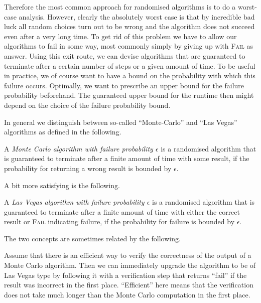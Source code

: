 Therefore the most common approach for randomised algorithms is to do a 
worst-case analysis. However, clearly the absolutely worst case is
that by incredible bad luck all random choices turn out to be wrong
and the algorithm does not succeed even after a very long time. To get
rid of this problem we have to allow our algorithms to fail in some
way, most commonly simply by giving up with \textsc{Fail} as answer.
Using this exit route, we can devise algorithms that are
guaranteed to terminate after a certain number of steps or a given
amount of time. To be useful in practice, we of course want to have a
bound on the probability with which this failure occurs. Optimally, we
want to prescribe an upper bound for the failure probability
beforehand. The guaranteed upper bound for the runtime then might
depend on the choice of the failure probability bound.

In general we distinguish between so-called ``Monte-Carlo'' and
``Las Vegas'' algorithms as defined in the following.

\begin{Def}
    A \emph{Monte Carlo algorithm with failure probability $\epsilon$}
    is a randomised algorithm that is guaranteed to terminate after
    a finite amount of time with some result, if the probability for
    returning a wrong result is bounded by $\epsilon$.
\end{Def}

A bit more satisfying is the following.

\begin{Def}
    A \emph{Las Vegas algorithm with failure probability $\epsilon$}
    is a randomised algorithm that is guaranteed to terminate after
    a finite amount of time with either the correct result or
    \textsc{Fail} indicating failure, if the probability for failure
    is bounded by $\epsilon$.
\end{Def}

The two concepts are sometimes related by the following.

\begin{Rem}
Assume that there is an efficient way to verify the correctness of the output
of a Monte Carlo algorithm. Then we can immediately upgrade the
algorithm to be of Las Vegas type by following it with a verification
step that returns ``fail'' if the result was incorrect in the first
place. ``Efficient'' here means that the verification does not take
much longer than the Monte Carlo computation in the first place.
\end{Rem}

